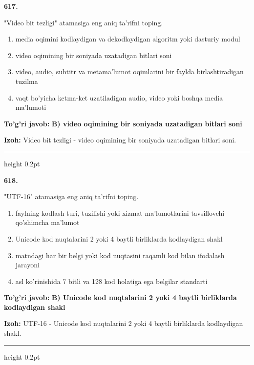 \documentclass[10pt,a4paper,oneside]{article}
\begin{document}
\noindent\textbf{\color{ink}617.}
\par
"Video bit tezligi" atamasiga eng aniq ta'rifni toping.
\begin{enumerate}[label=\Alph*),leftmargin=9mm]
\item media oqimini kodlaydigan va dekodlaydigan algoritm yoki dasturiy modul
\item video oqimining bir soniyada uzatadigan bitlari soni
\item video, audio, subtitr va metama'lumot oqimlarini bir faylda birlashtiradigan tuzilma
\item vaqt bo'yicha ketma-ket uzatiladigan audio, video yoki boshqa media ma'lumoti
\end{enumerate}
\begin{tcolorbox}[enhanced,breakable,colback=teal!4,colframe=teal!50!black,boxrule=0.5pt,arc=1.1mm,left=3mm,right=3mm,top=1.7mm,bottom=1.7mm,before skip=2mm,after skip=2mm]
\textbf{\color{teal}To'g'ri javob:} \textbf{B) video oqimining bir soniyada uzatadigan bitlari soni}
\par\smallskip
\textbf{Izoh:} Video bit tezligi - video oqimining bir soniyada uzatadigan bitlari soni.
\end{tcolorbox}
\vspace{2mm}\hrule height 0.2pt \vspace{3mm}

\noindent\textbf{\color{ink}618.}
\par
"UTF-16" atamasiga eng aniq ta'rifni toping.
\begin{enumerate}[label=\Alph*),leftmargin=9mm]
\item faylning kodlash turi, tuzilishi yoki xizmat ma'lumotlarini tavsiflovchi qo'shimcha ma'lumot
\item Unicode kod nuqtalarini 2 yoki 4 baytli birliklarda kodlaydigan shakl
\item matndagi har bir belgi yoki kod nuqtasini raqamli kod bilan ifodalash jarayoni
\item asl ko'rinishida 7 bitli va 128 kod holatiga ega belgilar standarti
\end{enumerate}
\begin{tcolorbox}[enhanced,breakable,colback=teal!4,colframe=teal!50!black,boxrule=0.5pt,arc=1.1mm,left=3mm,right=3mm,top=1.7mm,bottom=1.7mm,before skip=2mm,after skip=2mm]
\textbf{\color{teal}To'g'ri javob:} \textbf{B) Unicode kod nuqtalarini 2 yoki 4 baytli birliklarda kodlaydigan shakl}
\par\smallskip
\textbf{Izoh:} UTF-16 - Unicode kod nuqtalarini 2 yoki 4 baytli birliklarda kodlaydigan shakl.
\end{tcolorbox}
\vspace{2mm}\hrule height 0.2pt \vspace{3mm}
\end{document}
